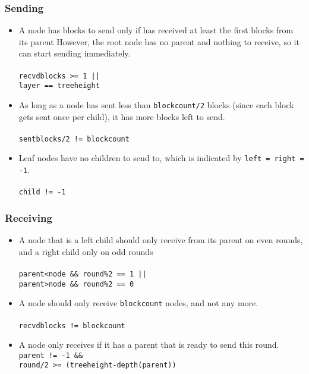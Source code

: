 \documentclass[twoside,twocolumn,hidelinks]{article}
\begin{document}
\subsubsection{Sending}
\begin{itemize}
      \item A node has blocks to send only if has received at least the first blocks from its parent However, the root node has no parent and nothing to receive, so it can start sending immediately.\\\\
      \texttt{recvdblocks >= 1 || \\ layer == treeheight}\\
      \item As long as a node has sent less than \texttt{blockcount/2} blocks (since each block gets sent once per child), it has more blocks left to send. \\\\
      \texttt{sentblocks/2 != blockcount}\\
      \item Leaf nodes have no children to send to, which is indicated by \texttt{left = right = -1}. \\\\
      \texttt{child != -1}
\end{itemize}

\subsubsection{Receiving}
\begin{itemize}
      \item A node that is a left child should only receive from its parent on even rounds, and a right child only on odd rounds \\\\
      \texttt{parent<node \&\& round\%2 == 1 || \\parent>node \&\& round\%2 == 0}\\
      \item A node should only receive \texttt{blockcount} nodes, and not any more. \\\\
      \texttt{recvdblocks != blockcount}\\
      \item A node only receives if it has a parent that is ready to send this round.
      \texttt{parent != -1 \&\& \\round/2 >= (treeheight-depth(parent))}\\
\end{itemize}
\end{document}
